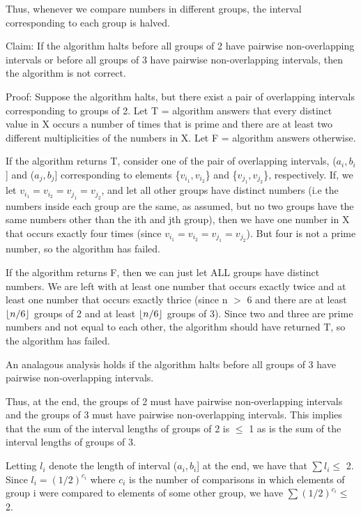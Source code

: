 \documentclass[11pt,a4paper]{article}
\DeclarePairedDelimiter\floor{\lfloor}{\rfloor}
\begin{document}
Thus, whenever we compare numbers in different groups, the interval corresponding to each group is halved.  \newline

Claim: If the algorithm halts before all groups of 2 have pairwise non-overlapping intervals or before all groups of 3 have pairwise non-overlapping intervals, then the algorithm is not correct. 

Proof: Suppose the algorithm halts, but there exist a pair of overlapping intervals corresponding to groups of 2. Let T = algorithm answers that every distinct value in X occurs a number of times that is prime and there are at least two different multiplicities of the numbers in X. Let F = algorithm answers otherwise. 

If the algorithm returns T, consider one of the pair of overlapping intervals, ($a_{i}, b_{i}$] and ($a_{j}, b_{j}$] corresponding to elements \{$v_{i_{1}}, v_{i_{2}}$\} and \{$v_{j_{1}}, v_{j_{2}}$\}, respectively. If, we let $v_{i_{1}} = v_{i_{2}} = v_{j_{1}} = v_{j_{2}}$, and let all other groups have distinct numbers (i.e the numbers inside each group are the same, as assumed, but no two groups have the same numbers other than the ith and jth group), then we have one number in X that occurs exactly four times (since $v_{i_{1}} = v_{i_{2}} = v_{j_{1}} = v_{j_{2}}$). But four is not a prime number, so the algorithm has failed. 

If the algorithm returns F, then we can just let ALL groups have distinct numbers. We are left with at least one number that occurs exactly twice and at least one number that occurs exactly thrice (since n $>$ 6 and there are at least $\floor{n/6}$ groups of 2 and at least $\floor{n/6}$ groups of 3). Since two and three are prime numbers and not equal to each other, the algorithm should have returned T, so the algorithm has failed. 

An analagous analysis holds if the algorithm halts before all groups of 3 have pairwise non-overlapping intervals. \newline

Thus, at the end, the groups of 2 must have pairwise non-overlapping intervals and the groups of 3 must have pairwise non-overlapping intervals. This implies that the sum of the interval lengths of groups of 2 is $\leq$ 1 as is the sum of the interval lengths of groups of 3.

Letting $l_{i}$ denote the length of interval ($a_{i}, b_{i}$] at the end, we have that 
$\sum l_{i} \leq$ 2. Since $l_{i} = (1/2)^{c_{i}}$ where $c_{i}$ is the number of comparisons in which elements of group i were compared to elements of some other group, we have $\sum (1/2)^{c_{i}} \leq$ 2.
\end{document}
